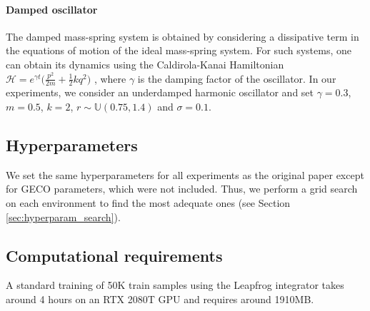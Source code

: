 \paragraph{Damped oscillator} The damped mass-spring system is obtained by considering a dissipative term in the equations of motion of the ideal mass-spring system. For such systems, one can obtain its dynamics using the Caldirola-Kanai Hamiltonian $\mathcal{H} = e^{\gamma t}\Big(\frac{p^2}{2m} + \frac{1}{2}kq^2 \Big)$ \cite{segovia2018one}, where $\gamma$ is the damping factor of the oscillator. In our experiments, we consider an underdamped harmonic oscillator and set $\gamma=0.3$, $m=0.5$, $k=2$, $r\sim\mathbb{U}(0.75, 1.4)$ and $\sigma=0.1$.


\subsection{Hyperparameters}
We set the same hyperparameters for all experiments as the original paper \cite{hgn} except for GECO parameters, which were not included.
Thus, we perform a grid search on each environment to find the most adequate ones (see Section \ref{sec:hyperparam_search}).


\subsection{Computational requirements}
A standard training of 50K train samples using the Leapfrog integrator takes around 4 hours on an RTX 2080T GPU and requires around 1910MB.
